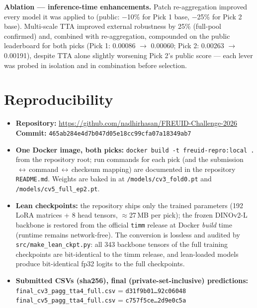 \documentclass[11pt,a4paper]{article}
\newcommand{\commitsha}{465ab284e4d7b047d05e18cc99cfa07a18349ab7}
\begin{document}
\noindent\textbf{Ablation --- inference-time enhancements.} Patch
re-aggregation improved every model it was applied to (public: $-$10\% for
Pick 1 base, $-$25\% for Pick 2 base). Multi-scale TTA improved external
robustness by 25\% (full-pool confirmed) and, combined with re-aggregation,
compounded on the public leaderboard for both picks (Pick 1: 0.00086
$\rightarrow$ 0.00060; Pick 2: 0.00263 $\rightarrow$ 0.00191), despite TTA
alone slightly worsening Pick 2's public score --- each lever was probed in
isolation and in combination before selection.

\section{Reproducibility}
\label{sec:repro}
\begin{itemize}[noitemsep]
  \item \textbf{Repository:} \url{https://github.com/nadhirhasan/FREUID-Challenge-2026}\\
    \textbf{Commit:} \footnotesize\texttt{\commitsha}\normalsize
  \item \textbf{One Docker image, both picks:} \texttt{docker build -t freuid-repro:local .}
    from the repository root; run commands for each pick (and the
    submission$\,\leftrightarrow\,$command$\,\leftrightarrow\,$checksum mapping)
    are documented in the repository \texttt{README.md}. Weights are baked in at
    \texttt{/models/cv3\_fold0.pt} and \texttt{/models/cv5\_full\_ep2.pt}.
  \item \textbf{Lean checkpoints:} the repository ships only the trained
    parameters (192 LoRA matrices + 8 head tensors, $\approx$27\,MB per pick);
    the frozen DINOv2-L backbone is restored from the official \texttt{timm}
    release at Docker \emph{build} time (runtime remains network-free). The
    conversion is lossless and audited by \texttt{src/make\_lean\_ckpt.py}: all
    343 backbone tensors of the full training checkpoints are bit-identical to
    the timm release, and lean-loaded models produce bit-identical fp32 logits
    to the full checkpoints.
  \item \textbf{Submitted CSVs (sha256), final (private-set-inclusive) predictions:}\\
    \footnotesize
    \texttt{final\_cv3\_pagg\_tta4\_full.csv} = \texttt{d31f9b01\ldots{}92c06048}\\
    \texttt{final\_cv5\_pagg\_tta4\_full.csv} = \texttt{c757f5ce\ldots{}2d9e0c5a}
    \normalsize\\

\end{itemize}
\end{document}
